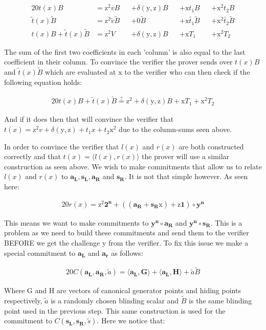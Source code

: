 \documentclass{article}
\newcommand{\eq}[1]{\begin{alignat*}{20}#1\end{alignat*}}
\renewcommand{\vec}[1]{\boldsymbol{#1}}
\newcommand{\ran}[1]{\mathrm{#1}}
\newcommand{\vecran}[1]{\mathbf{#1}}
\newcommand{\dotp}[2]{\langle #1, #2 \rangle}
\begin{document}
\eq{
	t(x)B &= \ran{z^2}vB &&+ \delta(\ran{y},\ran{z})B &&+ \ran{x}t_1B &&+ \ran{x^2}t_2B \\
	\widetilde{t}(x)\widetilde{B} &= \ran{z^2}\widetilde{v}\widetilde{B} &&+ 0\widetilde{B} &&+ \ran{x}\widetilde{t_1}\widetilde{B} &&+ \ran{x^2}\widetilde{t_2}\widetilde{B}\\
	t(x)B + \widetilde{t}(x)\widetilde{B} &= \ran{z^2}V &&+ \delta(\ran{y},\ran{z})B &&+ \ran{x}T_1 &&+ \ran{x^2}T_2
}

The sum of the first two coefficients in each 'column' is also equal to the last coefficient in their column. To convince the verifier the prover sends over $t(x)B$ and $\widetilde{t}(x)\widetilde{B}$ which are evaluated at $\ran{x}$ to the verifier who can then check if the following equation holds:

\eq{
	t(x)B + \widetilde{t}(x)\widetilde{B} \stackrel{?}{=} \ran{z^2} + \delta(\ran{y},\ran{z})B + \ran{x}T_1 + \ran{x^2}T_2
}

And if it does then that will convince the verifier that $t(x) = \ran{z^2}v + \delta(\ran{y},\ran{z}) + t_1x + t_2\ran{x^2}$ due to the column-sums seen above.

In order to convince the verifier that $l(x)$ and $r(x)$ are both constructed correctly and that $t(x) = \dotp{l(x)}{r(x)}$ the prover will use a similar construction as seen above. We wish to make commitments that allow us to relate $l(x)$ and $r(x)$ to $\vec{a_L}, \vec{s_L}, \vec{a_R}$ and $\vec{s_R}$. It is not that simple however. As seen here:

\eq{
	r(x) = \ran{z^2}\vec{2^n} + ((\vec{a_R} + \vec{s_R}\ran{x}) + \ran{z}\vec{1})\circ\vecran{y^n}
}

This means we want to make commitments to $\vec{y^n}\circ \vec{a_R}$ and $\vec{y^n}\circ\vec{s_R}$. This is a problem as we need to build these commitments and send them to the verifier BEFORE we get the challenge y from the verifier. To fix this issue we make a special commitment to $\vec{a_L}$ and $\vec{a_r}$ as follows:

\eq{
	C(\vec{a_L}, \vec{a_R}, \widetilde{a}) = \dotp{\vec{a_L}}{\vec{G}} + \dotp{\vec{a_L}}{\vec{H}} + \widetilde{a}\widetilde{B}
}

Where G and H are vectors of canonical generator points and hiding points respectively, $\widetilde{a}$ is a randomly chosen blinding scalar and $\widetilde{B}$ is the same blinding point used in the previous step. This same construction is used for the commitment to $C(\vec{s_L}, \vec{s_R}, \widetilde{s})$. Here we notice that: 
\end{document}
